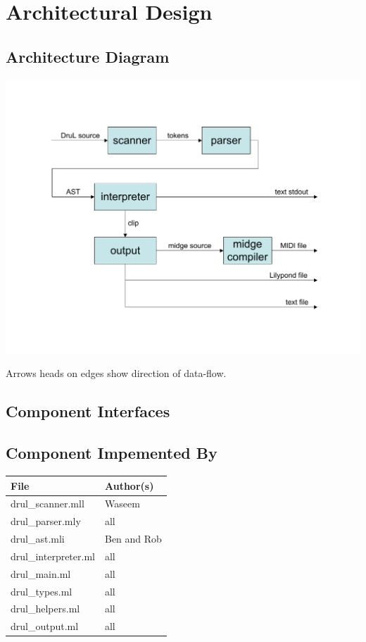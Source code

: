 
\chapter{Architectural Design}

\section{Architecture Diagram}

\includegraphics[width=150mm]{Architecture_diagram.pdf}

Arrows heads on edges show direction of data-flow.

\section{Component Interfaces}

\section{Component Impemented By}

\begin{tabular}{ | l | l | } \hline
	\textbf{File}        & \textbf{Author(s)} \\ \hline \hline
	drul\_scanner.mll    & Waseem             \\ \hline
	drul\_parser.mly     & all                \\ \hline
	drul\_ast.mli        & Ben and Rob        \\ \hline
	drul\_interpreter.ml & all                \\ \hline
	drul\_main.ml        & all                \\ \hline
	drul\_types.ml       & all                \\ \hline
	drul\_helpers.ml     & all                \\ \hline
	drul\_output.ml      & all                \\ \hline
\end{tabular}

